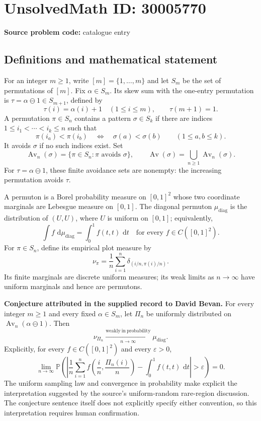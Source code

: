\documentclass[11pt]{article}
\newcommand{\dd}{\,\mathrm{d}}
\begin{document}
\section*{UnsolvedMath ID: 30005770}
\textbf{Source problem code:} catalogue entry
\subsection{Definitions and mathematical statement}
For an integer \(m\geq 1\), write \([m]=\{1,\ldots,m\}\) and let \(S_m\) be the set of permutations of \([m]\). Fix \(\alpha\in S_m\). Its skew sum with the one-entry permutation is \(\tau=\alpha\ominus 1\in S_{m+1}\), defined by
\[
\tau(i)=\alpha(i)+1\quad(1\leq i\leq m),\qquad \tau(m+1)=1.
\]
A permutation \(\pi\in S_n\) contains a pattern \(\sigma\in S_k\) if there are indices \(1\leq i_1<\cdots<i_k\leq n\) such that
\[
\pi(i_a)<\pi(i_b)\quad\Longleftrightarrow\quad \sigma(a)<\sigma(b)
\qquad(1\leq a,b\leq k).
\]
It avoids \(\sigma\) if no such indices exist. Set
\[
\operatorname{Av}_n(\sigma)=\{\pi\in S_n:\pi\text{ avoids }\sigma\},
\qquad
\operatorname{Av}(\sigma)=\bigcup_{n\geq 1}\operatorname{Av}_n(\sigma).
\]
For \(\tau=\alpha\ominus1\), these finite avoidance sets are nonempty: the increasing permutation avoids \(\tau\).

A permuton is a Borel probability measure on \([0,1]^2\) whose two coordinate marginals are Lebesgue measure on \([0,1]\). The diagonal permuton \(\mu_{\mathrm{diag}}\) is the distribution of \((U,U)\), where \(U\) is uniform on \([0,1]\); equivalently,
\[
\int f\,\dd\mu_{\mathrm{diag}}=\int_0^1 f(t,t)\,\dd t
\quad\text{for every }f\in C([0,1]^2).
\]
For \(\pi\in S_n\), define its empirical plot measure by
\[
\nu_\pi=\frac1n\sum_{i=1}^n\delta_{(i/n,\pi(i)/n)}.
\]
Its finite marginals are discrete uniform measures; its weak limits as \(n\to\infty\) have uniform marginals and hence are permutons.

\textbf{Conjecture attributed in the supplied record to David Bevan.} For every integer \(m\geq1\) and every fixed \(\alpha\in S_m\), let \(\Pi_n\) be uniformly distributed on \(\operatorname{Av}_n(\alpha\ominus1)\). Then
\[
\nu_{\Pi_n}\xrightarrow[n\to\infty]{\mathrm{weakly\ in\ probability}}\mu_{\mathrm{diag}}.
\]
Explicitly, for every \(f\in C([0,1]^2)\) and every \(\varepsilon>0\),
\[
\lim_{n\to\infty}
\mathbb P\!\left(
\left|\frac1n\sum_{i=1}^n f\!\left(\frac{i}{n},\frac{\Pi_n(i)}{n}\right)
-\int_0^1 f(t,t)\,\dd t\right|>\varepsilon
\right)=0.
\]
The uniform sampling law and convergence in probability make explicit the interpretation suggested by the source's uniform-random rare-region discussion. The conjecture sentence itself does not explicitly specify either convention, so this interpretation requires human confirmation.
\end{document}
